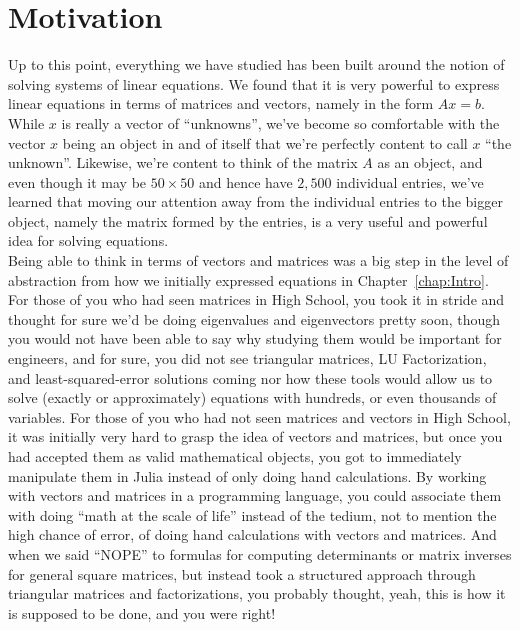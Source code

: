 \section{Motivation}

Up to this point, everything we have studied has been built around the notion of solving systems of linear equations. We found that it is very powerful to express linear equations in terms of matrices and vectors, namely in the form $Ax=b$. While $x$ is really a vector of ``unknowns'', we've become so comfortable with the vector $x$ being an object in and of itself that we're perfectly content to call $x$ ``the unknown''. Likewise, we're content to think of the matrix $A$ as an object, and even though it may be $50 \times 50$ and hence have $2,500$ individual entries, we've learned that moving our attention away from the individual entries to the bigger object, namely the matrix formed by the entries, is a very useful and powerful idea for solving equations.\\

Being able to think in terms of vectors and matrices was a big step in the level of abstraction from how we initially expressed equations in Chapter~\ref{chap:Intro}. For those of you who had seen matrices in High School, you took it in stride and thought for sure we'd be doing eigenvalues and eigenvectors pretty soon, though you would not have been able to say why studying them would be important for engineers, and for sure, you did not see triangular matrices, LU Factorization, and least-squared-error solutions coming nor how these tools would allow us to solve (exactly or approximately) equations with hundreds, or even thousands of variables. For those of you who had not seen matrices and vectors in High School, it was initially very hard to grasp the idea of vectors and matrices, but once you had accepted them as valid mathematical objects, you got to immediately manipulate them in Julia instead of only doing hand calculations. By working with vectors and matrices in a programming language, you could associate them with doing ``math at the scale of life'' instead of the tedium, not to mention the high chance of error, of doing hand calculations with vectors and matrices. And when we said ``NOPE'' to formulas for computing determinants or matrix inverses for general square matrices, but instead took a structured approach through triangular matrices and factorizations, you probably thought, yeah, this is how it is supposed to be done, and you were right! \\


